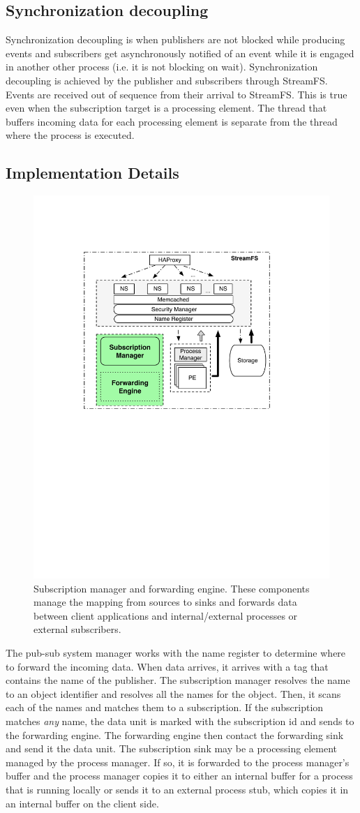 \subsection{Synchronization decoupling}
Synchronization decoupling is when publishers are not blocked while producing events and subscribers get asynchronously notified
of an event while it is engaged in another other process (i.e. it is not blocking on wait).
Synchronization decoupling is achieved by the publisher and subscribers through StreamFS.  Events are received out of sequence
from their arrival to StreamFS.  This is true even when the subscription target is a processing element.  The thread that buffers
incoming data for each processing element is separate from the thread where the process is executed.



\subsection{Implementation Details}

\begin{figure}[h!] %
\centering
\includegraphics[width=.55\columnwidth]{figs/submngr}
\caption{Subscription manager and forwarding engine.  These components manage the mapping from sources to sinks and forwards
data between client applications and internal/external processes or external subscribers.}
\label{fig:submngr}
\end{figure}

The pub-sub system manager works with the name register to determine where to forward the incoming data.  When data arrives, it arrives
with a tag that contains the name of the publisher.  The subscription manager resolves the name to an object identifier and resolves
all the names for the object.  Then, it scans each of the names and matches them to a subscription.  If the subscription matches \emph{any}
name, the data unit is marked with the subscription id and sends to the forwarding engine.  The forwarding engine then
contact the forwarding sink and send it the data unit.  The subscription sink may be a processing element managed by the process manager.
If so, it is forwarded to the process manager's buffer and the process manager copies it to either an internal buffer for a
process that is running locally or sends it to an external process stub, which copies it in an internal buffer on the client side.
